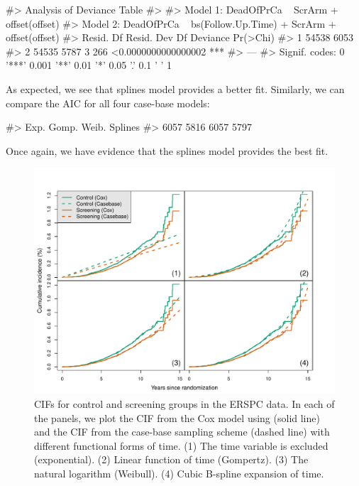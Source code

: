 \documentclass[
]{jss}
\begin{document}
\begin{CodeChunk}

\begin{CodeOutput}
#> Analysis of Deviance Table
#> 
#> Model 1: DeadOfPrCa ~ ScrArm + offset(offset)
#> Model 2: DeadOfPrCa ~ bs(Follow.Up.Time) + ScrArm + offset(offset)
#>   Resid. Df Resid. Dev Df Deviance            Pr(>Chi)    
#> 1     54538       6053                                    
#> 2     54535       5787  3      266 <0.0000000000000002 ***
#> ---
#> Signif. codes:  0 '***' 0.001 '**' 0.01 '*' 0.05 '.' 0.1 ' ' 1
\end{CodeOutput}
\end{CodeChunk}

As expected, we see that splines model provides a better fit. Similarly,
we can compare the AIC for all four case-base models:

\begin{CodeChunk}

\begin{CodeOutput}
#>    Exp.   Gomp.   Weib. Splines 
#>    6057    5816    6057    5797
\end{CodeOutput}
\end{CodeChunk}

Once again, we have evidence that the splines model provides the best
fit.

\begin{CodeChunk}
\begin{figure}

{\centering \includegraphics{../figures/erspc-cox-cif-1} 

}

\caption{CIFs for control and screening groups in the ERSPC data. In each of the panels, we plot the CIF from the Cox model using  (solid line) and the CIF from the case-base sampling scheme (dashed line) with different functional forms of time. (1) The time variable is excluded (exponential). (2) Linear function of time (Gompertz). (3) The natural logarithm (Weibull). (4) Cubic B-spline expansion of time.}\label{fig:erspc-cox-cif}
\end{figure}
\end{CodeChunk}
\end{document}

